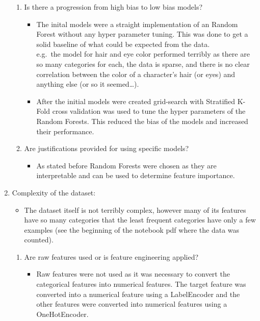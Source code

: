 \documentclass[12pt]{article}
\begin{document}
\begin{enumerate}
\begin{itemize}
        \end{itemize}
        \begin{enumerate}
            \item Is there a progression from high bias to low bias models?
            \begin{itemize}
                \item The inital models were a straight implementation of an Random Forest without any hyper parameter tuning. This was done to get a solid baseline of what could be expected from the data. \\
                e.g.\ the model for hair and eye color performed terribly as there are so many categories for each, the data is sparse, and there is no clear correlation between the color of a character's hair (or eyes) and anything else (or so it seemed\ldots).
                \item After the initial models were created grid-search with Stratified K-Fold cross validation was used to tune the hyper parameters of the Random Forests. This reduced the bias of the models and increased their performance.
            \end{itemize}
            \item Are justifications provided for using specific models?
            \begin{itemize}
                \item As stated before Random Forests were chosen as they are interpretable and can be used to determine feature importance.
            \end{itemize}
        \end{enumerate}
        \item Complexity of the dataset:
        \begin{itemize}
            \item The dataset itself is not terribly complex, however many of its features have so many categories that the least frequent categories have only a few examples (see the beginning of the notebook pdf where the data was counted).
        \end{itemize}
        \begin{enumerate}
            \item Are raw features used or is feature engineering applied?
            \begin{itemize}
                \item Raw features were not used as it was necessary to convert the categorical features into numerical features. The target feature was converted into a numerical feature using a LabelEncoder and the other features were converted into numerical features using a OneHotEncoder.

\end{itemize}
\end{enumerate}
\end{enumerate}
\end{document}
